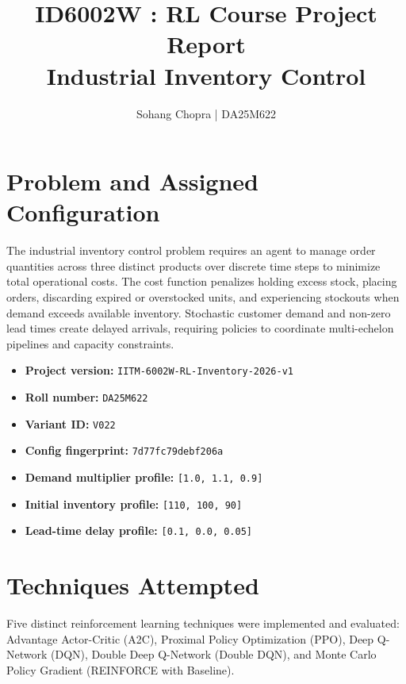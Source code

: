 \documentclass[11pt,a4paper]{article}
\title{\textbf{ID6002W : RL Course Project Report}\\[0.4em]
\large Industrial Inventory Control}
\author{Sohang Chopra \quad | \quad DA25M622}
\date{}
\begin{document}
\maketitle

\section{Problem and Assigned Configuration}

The industrial inventory control problem requires an agent to manage order quantities across three distinct products over discrete time steps to minimize total operational costs. The cost function penalizes holding excess stock, placing orders, discarding expired or overstocked units, and experiencing stockouts when demand exceeds available inventory. Stochastic customer demand and non-zero lead times create delayed arrivals, requiring policies to coordinate multi-echelon pipelines and capacity constraints.

\begin{itemize}
    \item \textbf{Project version:} \texttt{IITM-6002W-RL-Inventory-2026-v1}
    \item \textbf{Roll number:} \texttt{DA25M622}
    \item \textbf{Variant ID:} \texttt{V022}
    \item \textbf{Config fingerprint:} \texttt{7d77fc79debf206a}
    \item \textbf{Demand multiplier profile:} \texttt{[1.0, 1.1, 0.9]}
    \item \textbf{Initial inventory profile:} \texttt{[110, 100, 90]}
    \item \textbf{Lead-time delay profile:} \texttt{[0.1, 0.0, 0.05]}
\end{itemize}

\section{Techniques Attempted}

Five distinct reinforcement learning techniques were implemented and evaluated: Advantage Actor-Critic (A2C), Proximal Policy Optimization (PPO), Deep Q-Network (DQN), Double Deep Q-Network (Double DQN), and Monte Carlo Policy Gradient (REINFORCE with Baseline). 
\end{document}
